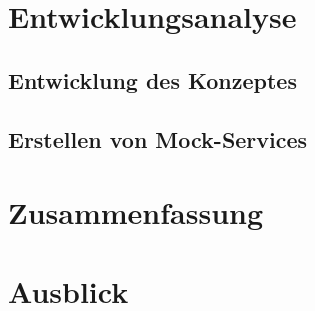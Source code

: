 
\chapter{Entwicklungsanalyse}



    \section{Entwicklung des Konzeptes}
    \section{Erstellen von Mock-Services}

\chapter{Zusammenfassung}

\chapter{Ausblick}


